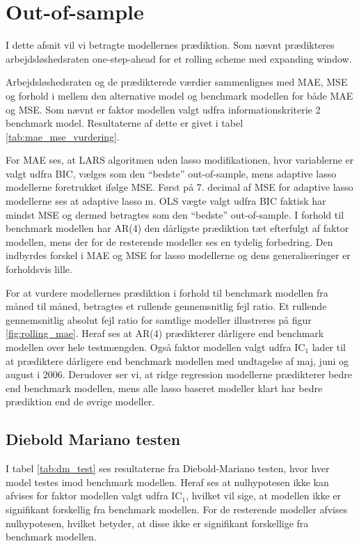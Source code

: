 \section{Out-of-sample}
I dette afsnit vil vi betragte modellernes prædiktion.
Som nævnt prædikteres arbejdsløshedsraten one-step-ahead for et rolling scheme med expanding window.

Arbejdsløshedsraten og de prædikterede værdier sammenlignes med MAE, MSE og forhold i mellem den alternative model og benchmark modellen for både MAE og MSE.
Som nævnt er faktor modellen valgt udfra informationskriterie 2 benchmark model.
Resultaterne af dette er givet i tabel \ref{tab:mae_mse_vurdering}.
%


For MAE ses, at LARS algoritmen uden lasso modifikationen, hvor variablerne er valgt udfra BIC, vælges som den ``bedste'' out-of-sample, mens adaptive lasso modellerne foretrukket
ifølge MSE.
Først på 7. decimal af MSE for adaptive lasso modellerne ses at adaptive lasso m. OLS vægte valgt udfra BIC faktisk har mindst MSE og dermed betragtes som den ``bedste'' out-of-sample.
I forhold til benchmark modellen har AR(4) den dårligste prædiktion tæt efterfulgt af faktor modellen, mens der for de resterende modeller ses en tydelig forbedring.
Den indbyrdes forskel i MAE og MSE for lasso modellerne og dens generaliseringer er forholdsvis lille.

For at vurdere modellernes prædiktion i forhold til benchmark modellen fra måned til måned, betragtes et rullende gennemsnitlig fejl ratio.
Et rullende gennemsnitlig absolut fejl ratio for samtlige modeller illustreres på figur \ref{fig:rolling_mae}.
Heraf ses at AR(4) prædikterer dårligere end benchmark modellen over hele testmængden.
Også faktor modellen valgt udfra IC$_1$ lader til at prædiktere dårligere end benchmark modellen med undtagelse af maj, juni og august i 2006.
Derudover ser vi, at ridge regression modellerne prædikterer bedre end benchmark modellen, mens alle lasso baseret modeller klart har bedre prædiktion end de øvrige modeller.
%
%

%
%

\subsection{Diebold Mariano testen}
I tabel \ref{tab:dm_test} ses resultaterne fra Diebold-Mariano testen, hvor hver model testes imod benchmark modellen.
Heraf ses at nulhypotesen ikke kan afvises for faktor modellen valgt udfra IC\(_1\), hvilket vil sige, at modellen ikke er signifikant forskellig fra benchmark modellen.
For de resterende modeller afvises nulhypotesen, hvilket betyder, at disse ikke er signifikant forskellige fra benchmark modellen.
%

%
\newpage
